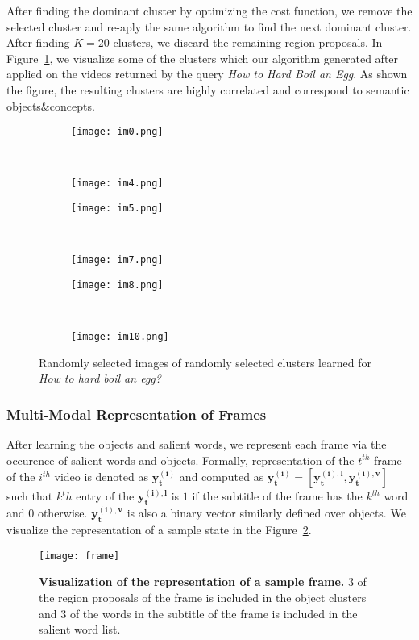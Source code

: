 After finding the dominant cluster by optimizing the cost function, we remove the selected cluster and re-aply the same algorithm to find the next dominant cluster. After finding $K=20$ clusters, we discard the remaining region proposals. In Figure~\ref{cvis}, we visualize some of the clusters which our algorithm generated after applied on the videos returned by the query \emph{How to Hard Boil an Egg}. As shown the figure, the resulting clusters are highly correlated and correspond to semantic objects\&concepts.
\begin{figure}[ht]
  \begin{subfigure}[b]{0.23\textwidth}
\texttt{[image: im0.png]}
\end{subfigure}
~
\begin{subfigure}[b]{0.23\textwidth}
\texttt{[image: im4.png]}
\end{subfigure}
\begin{subfigure}[b]{0.23\textwidth}
\texttt{[image: im5.png]}
\end{subfigure}
~
\begin{subfigure}[b]{0.23\textwidth}
\texttt{[image: im7.png]}
\end{subfigure}

\begin{subfigure}[b]{0.23\textwidth}
\texttt{[image: im8.png]}
\end{subfigure}
~
\begin{subfigure}[b]{0.23\textwidth}
\texttt{[image: im10.png]}
\end{subfigure}
\caption{Randomly selected images of randomly selected clusters learned for \emph{How to hard boil an egg?}}
\label{cvis}
\end{figure}


\subsubsection{Multi-Modal Representation of Frames}
After learning the objects and salient words, we represent each frame via the occurence of salient words and objects. Formally, representation of the $t^{th}$ frame of the $i^{th}$ video is denoted as $\mathbf{y^{(i)}_t}$ and computed as $\mathbf{y^{(i)}_t}=[\mathbf{y^{(i),l}_t},\mathbf{y^{(i),v}_t}]$ such that $k^th$ entry of the $\mathbf{y^{(i),l}_t}$ is $1$ if the subtitle of the frame has the $k^{th}$ word and $0$ otherwise. $\mathbf{y^{(i),v}_t}$ is also a binary vector similarly defined over objects. We visualize the representation of a sample state in the Figure~\ref{visFrame}.

\begin{figure}
  \texttt{[image: frame]}
  \caption{\textbf{Visualization of the representation of a sample frame.} 3 of the region proposals of the frame is included in the object clusters and 3 of the words in the subtitle of the frame is included in the salient word list.}
  \label{visFrame}
\end{figure}
